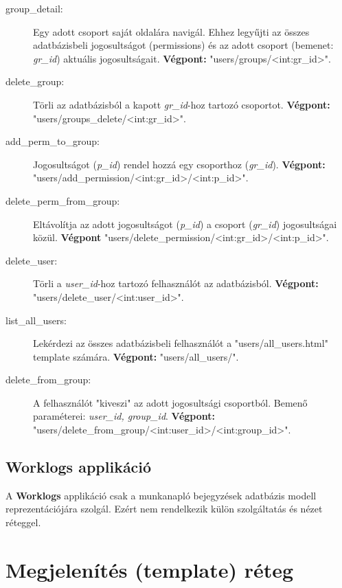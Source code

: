 \begin{itemize}
\begin{description}
		\item[group\_detail:] Egy adott csoport saját oldalára navigál. Ehhez legyűjti az összes adatbázisbeli jogosultságot (permissions) és az adott csoport (bemenet: \textit{gr\_id}) aktuális jogosultságait. \textbf{Végpont:} "users/groups/<int:gr\_id>".
		\item[delete\_group:] Törli az adatbázisból a kapott \textit{gr\_id}-hoz tartozó csoportot. \textbf{Végpont:} "users/groups\_delete/<int:gr\_id>".
		\item[add\_perm\_to\_group:] Jogosultságot (\textit{p\_id}) rendel hozzá egy csoporthoz (\textit{gr\_id}). \textbf{Végpont:} "users/add\_permission/<int:gr\_id>/<int:p\_id>".
		\item[delete\_perm\_from\_group:] Eltávolítja az adott jogosultságot (\textit{p\_id}) a csoport (\textit{gr\_id}) jogosultságai közül. \textbf{Végpont} "users/delete\_permission/<int:gr\_id>/<int:p\_id>".
		\item[delete\_user:] Törli a \textit{user\_id}-hoz tartozó felhasználót az adatbázisból. \textbf{Végpont:} "users/delete\_user/<int:user\_id>".
		\item[list\_all\_users:] Lekérdezi az összes adatbázisbeli felhasználót a "users/all\_users.html" template számára. \textbf{Végpont:} "users/all\_users/".
		\item[delete\_from\_group:] A felhasználót "kiveszi" az adott jogosultsági csoportból. Bemenő paraméterei: \textit{user\_id, group\_id}. \textbf{Végpont:} "users/delete\_from\_group/<int:user\_id>/<int:group\_id>".
	\end{description}
\end{itemize}	

\subsection{Worklogs applikáció}

A \textbf{Worklogs} applikáció csak a munkanapló bejegyzések adatbázis modell reprezentációjára szolgál. Ezért nem rendelkezik külön szolgáltatás és nézet réteggel.

\section{Megjelenítés (template) réteg}

